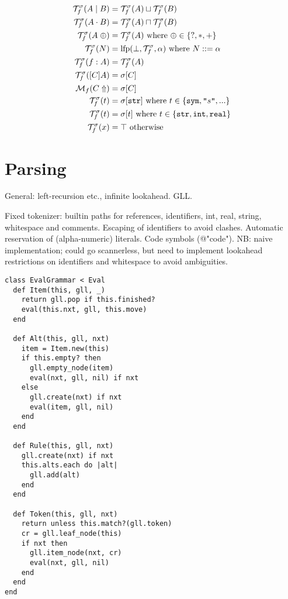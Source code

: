 \documentclass[a4paper]{article}
\begin{document}
\def\mytypejoin{\ensuremath{\sqcup}}
\def\mytypemeet{\ensuremath{\sqcap}}
\def\mytypebottom{\ensuremath{\bot}}
\def\mytypetop{\ensuremath{\top}}
\def\typeof{\ensuremath{\mathcal{T}}}
\def\typeoff{\ensuremath{\typeof^\sigma_f}}
\begin{align}
\typeoff(A\mid B) &= \typeoff(A) \mytypejoin  \typeoff(B)\\
\typeoff(A\cdot B) &= \typeoff(A) \mytypemeet  \typeoff(B)\\
\typeoff(A\;\oplus) &= \typeoff(A) \text{ where } \oplus \in \{?, *, +\}\\
\typeoff(N) &= \fixpoint(\mytypebottom, \typeoff, \alpha) \text{ where } N ::= \alpha\\
\typeoff(f: A) &= \typeoff(A)\\
\typeoff([C] A) &= \sigma[C]\\
\multoff(C\Uparrow) &= \sigma[C]\\
\typeoff(t) &= \sigma[\text{\texttt{str}}] \text{ where } t\in\{\text{\texttt{sym}}, \literal{s}, ...\}\\
\typeoff(t) &= \sigma[t] \text{ where } t\in \{\text{\texttt{str}}, \text{\texttt{int}}, \text{\texttt{real}} \}\\
\typeoff(x) &= \mytypetop \text{ otherwise}
\end{align}



\section{Parsing}

General: left-recursion etc., infinite lookahead. GLL. 

Fixed tokenizer: builtin paths for references, identifiers, int, real,
string, whitespace and comments. Escaping of identifiers to avoid
clashes. Automatic reservation of (alpha-numeric) literals. Code
symbols (@"code"). NB: naive implementation; could go scannerless, but
need to implement lookahead restrictions on identifiers and whitespace
to avoid ambiguities.

\begin{verbatim}
class EvalGrammar < Eval
  def Item(this, gll, _)
    return gll.pop if this.finished?
    eval(this.nxt, gll, this.move)
  end

  def Alt(this, gll, nxt)
    item = Item.new(this)
    if this.empty? then
      gll.empty_node(item)
      eval(nxt, gll, nil) if nxt
    else
      gll.create(nxt) if nxt
      eval(item, gll, nil)
    end
  end
  
  def Rule(this, gll, nxt)
    gll.create(nxt) if nxt
    this.alts.each do |alt|
      gll.add(alt)
    end
  end

  def Token(this, gll, nxt)
    return unless this.match?(gll.token)
    cr = gll.leaf_node(this)
    if nxt then
      gll.item_node(nxt, cr)
      eval(nxt, gll, nil)
    end
  end
end
\end{verbatim}
\end{document}
